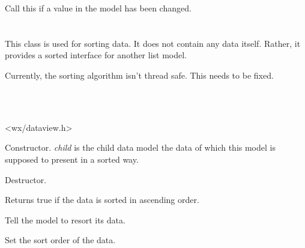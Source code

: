 \label{wxdataviewlistmodelvaluechanged}


Call this if a value in the model has been changed.


\section{}\label{wxdataviewsortedlistmodel}

This class is used for sorting data. It does not contain any
data itself. Rather, it provides a sorted interface for 
another list model.

Currently, the sorting algorithm isn't thread safe. This needs
to be fixed.


\\
\\


<wx/dataview.h>

\label{wxdataviewsortedlistmodelwxdataviewsortedlistmodel}


Constructor. {\it child} is the child data model the data of
which this model is supposed to present in a sorted way.

\label{wxdataviewsortedlistmodeldtor}


Destructor.

\label{wxdataviewsortedlistmodelgetascending}


Returns true if the data is sorted in ascending order.

\label{wxdataviewsortedlistmodelresort}


Tell the model to resort its data.

\label{wxdataviewsortedlistmodelsetascending}


Set the sort order of the data.


